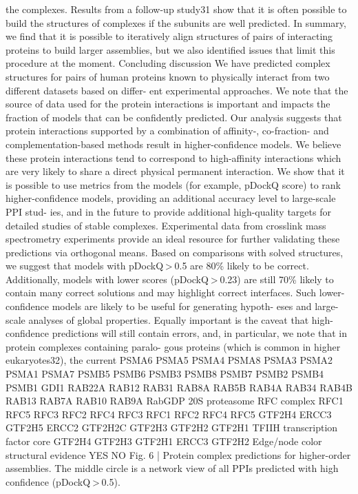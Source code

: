 the complexes. Results from a follow-up study31 show that it is often
possible to build the structures of complexes if the subunits are well
predicted. In summary, we find that it is possible to iteratively align
structures of pairs of interacting proteins to build larger assemblies,
but we also identified issues that limit this procedure at the moment.
Concluding discussion
We have predicted complex structures for pairs of human proteins
known to physically interact from two different datasets based on differ-
ent experimental approaches. We note that the source of data used for
the protein interactions is important and impacts the fraction of models
that can be confidently predicted. Our analysis suggests that protein
interactions supported by a combination of affinity-, co-fraction-
and complementation-based methods result in higher-confidence
models. We believe these protein interactions tend to correspond to
high-affinity interactions which are very likely to share a direct physical
permanent interaction. We show that it is possible to use metrics from
the models (for example, pDockQ score) to rank higher-confidence
models, providing an additional accuracy level to large-scale PPI stud-
ies, and in the future to provide additional high-quality targets for
detailed studies of stable complexes. Experimental data from crosslink
mass spectrometry experiments provide an ideal resource for further
validating these predictions via orthogonal means.
Based on comparisons with solved structures, we suggest that
models with pDockQ > 0.5 are 80\% likely to be correct. Additionally,
models with lower scores (pDockQ > 0.23) are still 70\% likely to contain
many correct solutions and may highlight correct interfaces. Such
lower-confidence models are likely to be useful for generating hypoth-
eses and large-scale analyses of global properties. Equally important
is the caveat that high-confidence predictions will still contain errors,
and, in particular, we note that in protein complexes containing paralo-
gous proteins (which is common in higher eukaryotes32), the current
PSMA6
PSMA5
PSMA4
PSMA8
PSMA3
PSMA2
PSMA1
PSMA7
PSMB5
PSMB6
PSMB3
PSMB8
PSMB7
PSMB2
PSMB4
PSMB1
GDI1
RAB22A
RAB12
RAB31
RAB8A
RAB5B
RAB4A
RAB34
RAB4B
RAB13
RAB7A
RAB10
RAB9A
RabGDP
20S proteasome
RFC complex
RFC1
RFC5
RFC3
RFC2
RFC4
RFC3
RFC1
RFC2
RFC4
RFC5
GTF2H4
ERCC3
GTF2H5
ERCC2
GTF2H2C
GTF2H3
GTF2H2
GTF2H1
TFIIH transcription factor core
GTF2H4
GTF2H3
GTF2H1
ERCC3
GTF2H2
Edge/node color
structural evidence
YES
NO
Fig. 6 | Protein complex predictions for higher-order assemblies. The middle
circle is a network view of all PPIs predicted with high confidence (pDockQ > 0.5).
